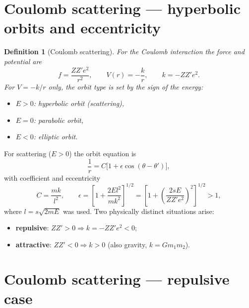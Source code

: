 \documentclass[11pt]{article}
\newtheorem{definition}{Definition}
\begin{document}
\section{Coulomb scattering --- hyperbolic orbits and eccentricity}

\begin{definition}[Coulomb scattering]
For the Coulomb interaction the force and potential are
\begin{equation}
  f = \frac{ZZ'e^2}{r^2}, \qquad V(r) = -\frac{k}{r}, \qquad k = -ZZ'e^2.
\end{equation}
For $V = -k/r$ \emph{only}, the orbit type is set by the sign of the energy:
\begin{itemize}
  \item $E > 0$: hyperbolic orbit (scattering),
  \item $E = 0$: parabolic orbit,
  \item $E < 0$: elliptic orbit.
\end{itemize}
\end{definition}

For scattering ($E > 0$) the orbit equation is
\begin{equation}
  \frac{1}{r} = C\bigl[1 + \epsilon\cos(\theta - \theta')\bigr],
\end{equation}
with coefficient and eccentricity
\begin{equation}
  C = \frac{mk}{l^2}, \qquad
  \epsilon = \left[1 + \frac{2El^2}{mk^2}\right]^{1/2}
           = \left[1 + \left(\frac{2sE}{ZZ'e^2}\right)^2\right]^{1/2} > 1,
\end{equation}
where $l = s\sqrt{2mE}$ was used. Two physically distinct situations arise:
\begin{itemize}
  \item[i)] \textbf{repulsive}: $ZZ' > 0 \Rightarrow k = -ZZ'e^2 < 0$;
  \item[ii)] \textbf{attractive}: $ZZ' < 0 \Rightarrow k > 0$ (also gravity, $k = Gm_1m_2$).
\end{itemize}

\section{Coulomb scattering --- repulsive case}
\end{document}
